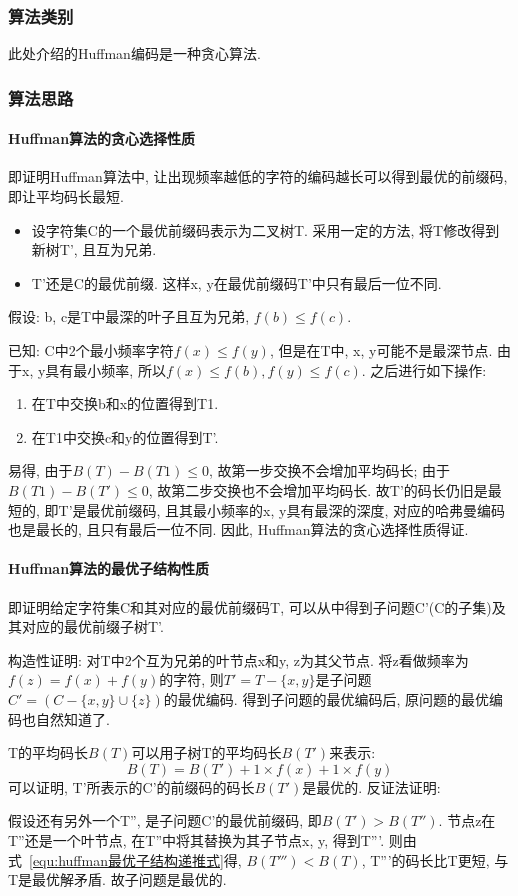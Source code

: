 \subsubsection{算法类别}
此处介绍的Huffman编码是一种贪心算法.

\subsubsection{算法思路}
\paragraph{Huffman算法的贪心选择性质}
即证明Huffman算法中, 让出现频率越低的字符的编码越长可以得到最优的前缀码,
即让平均码长最短.

\begin{itemize}
	\item 设字符集C的一个最优前缀码表示为二叉树T. 采用一定的方法, 将T修改得到新树T',
	      且互为兄弟.
	\item T'还是C的最优前缀. 这样x, y在最优前缀码T'中只有最后一位不同.
\end{itemize}

假设: b, c是T中最深的叶子且互为兄弟, $f(b)\leq f(c)$.\par
已知: C中2个最小频率字符$f(x)\leq f(y)$, 但是在T中, x, y可能不是最深节点. 由于x,
y具有最小频率, 所以$f(x)\leq f(b), f(y)\leq f(c)$. 之后进行如下操作:
\begin{enumerate}
	\item 在T中交换b和x的位置得到T1.
	\item 在T1中交换c和y的位置得到T'.
\end{enumerate}

易得, 由于$B(T) - B(T1)\leq 0$, 故第一步交换不会增加平均码长; 由于$B(T1) -
	B(T')\leq 0$, 故第二步交换也不会增加平均码长. 故T'的码长仍旧是最短的,
即T'是最优前缀码, 且其最小频率的x, y具有最深的深度, 对应的哈弗曼编码也是最长的,
且只有最后一位不同. 因此, Huffman算法的贪心选择性质得证.

\paragraph{Huffman算法的最优子结构性质} %
\label{par:Huffman算法的最优子结构性质}
即证明给定字符集C和其对应的最优前缀码T,
可以从中得到子问题C'(C的子集)及其对应的最优前缀子树T'.\par
构造性证明: 对T中2个互为兄弟的叶节点x和y, z为其父节点.
将z看做频率为$f(z)=f(x)+f(y)$的字符,
则$T'=T-\{x,y\}$是子问题$C'=(C-\{x,y\}\cup \{z\})$的最优编码.
得到子问题的最优编码后, 原问题的最优编码也自然知道了. \par
T的平均码长$B(T)$可以用子树T的平均码长$B(T')$来表示:
\begin{equation}
	B(T) = B(T') + 1\times f(x) + 1\times f(y)
	\label{equ:huffman最优子结构递推式}
\end{equation}
可以证明, T'所表示的C'的前缀码的码长$B(T')$是最优的. 反证法证明:\par
假设还有另外一个T'', 是子问题C'的最优前缀码, 即$B(T') > B(T'')$.
节点z在T''还是一个叶节点, 在T''中将其替换为其子节点x, y, 得到T'''.
则由式~\ref{equ:huffman最优子结构递推式}得, $B(T''') < B(T)$, T'''的码长比T更短,
与T是最优解矛盾. 故子问题是最优的.
